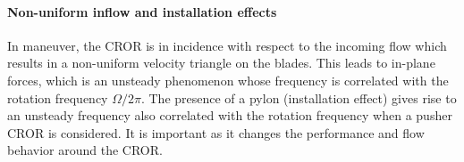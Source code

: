 \paragraph{Non-uniform inflow and installation effects}

In maneuver, the CROR is in incidence with respect to the incoming flow
which results in a non-uniform velocity triangle on the blades.
This leads to in-plane forces, which is an unsteady phenomenon
whose frequency is correlated with the rotation frequency $\Omega / 2 \pi$.
The presence of a pylon (installation effect) gives rise to an unsteady frequency
also correlated with the rotation frequency when a pusher CROR is considered.
It is important as it changes the performance and flow behavior around the CROR.
